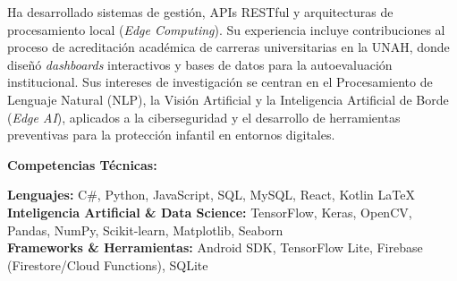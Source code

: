 Ha desarrollado sistemas de gestión, APIs RESTful y arquitecturas de procesamiento local (\textit{Edge Computing}). Su experiencia incluye contribuciones al proceso de acreditación académica de carreras universitarias en la UNAH, donde diseñó \textit{dashboards} interactivos y bases de datos para la autoevaluación institucional. Sus intereses de investigación se centran en el Procesamiento de Lenguaje Natural (NLP), la Visión Artificial y la Inteligencia Artificial de Borde (\textit{Edge AI}), aplicados a la ciberseguridad y el desarrollo de herramientas preventivas para la protección infantil en entornos digitales.
\vspace{0.4cm}

%
%
%
%
\noindent\textbf{Competencias Técnicas:}

\vspace{0.2cm}

\noindent
\textbf{Lenguajes:} C\#, Python, JavaScript, SQL, MySQL, React, Kotlin \LaTeX{} \\
\textbf{Inteligencia Artificial \& Data Science:} TensorFlow, Keras, OpenCV, Pandas, NumPy, Scikit-learn, Matplotlib, Seaborn \\
\textbf{Frameworks \& Herramientas:} Android SDK, TensorFlow Lite, Firebase (Firestore/Cloud Functions), SQLite

\MediaOptionLogic